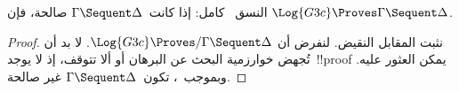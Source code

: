 \documentclass[../../../include/open-logic-section]{subfiles}
\begin{document}
\begin{cor}
النسق~ كامل: إذا كانت~$\Gamma \Sequent \Delta$ صالحة، فإن
$\Log{G3c}\Proves\Gamma \Sequent \Delta$.
\end{cor}

\begin{proof}
  نثبت المقابل النقيض. لنفرض أن
  $\Log{G3c}\Proves/\Gamma \Sequent \Delta$. لا بد أن تُجهض خوارزمية
  البحث عن البرهان أو ألا تتوقف، إذ لا يوجد~!!{proof} يمكن العثور عليه.
  وبموجب~، تكون~$\Gamma \Sequent \Delta$ غير صالحة.
\end{proof}
\end{document}
